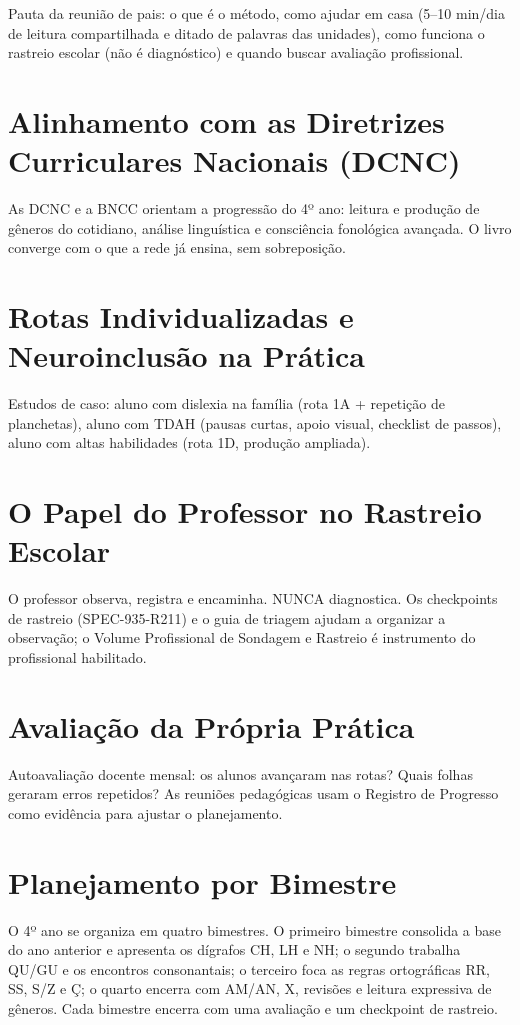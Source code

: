 Pauta da reunião de pais: o que é o método, como ajudar em casa (5–10 min/dia de leitura compartilhada e ditado de palavras das unidades), como funciona o rastreio escolar (não é diagnóstico) e quando buscar avaliação profissional.


\chapter{Alinhamento com as Diretrizes Curriculares Nacionais (DCNC)}

As DCNC e a BNCC orientam a progressão do 4º ano: leitura e produção de gêneros do cotidiano, análise linguística e consciência fonológica avançada. O livro converge com o que a rede já ensina, sem sobreposição.


\chapter{Rotas Individualizadas e Neuroinclusão na Prática}

Estudos de caso: aluno com dislexia na família (rota 1A + repetição de planchetas), aluno com TDAH (pausas curtas, apoio visual, checklist de passos), aluno com altas habilidades (rota 1D, produção ampliada).


\chapter{O Papel do Professor no Rastreio Escolar}

O professor observa, registra e encaminha. NUNCA diagnostica. Os checkpoints de rastreio (SPEC-935-R211) e o guia de triagem ajudam a organizar a observação; o Volume Profissional de Sondagem e Rastreio é instrumento do profissional habilitado.


\chapter{Avaliação da Própria Prática}

Autoavaliação docente mensal: os alunos avançaram nas rotas? Quais folhas geraram erros repetidos? As reuniões pedagógicas usam o Registro de Progresso como evidência para ajustar o planejamento.


\chapter{Planejamento por Bimestre}

O 4º ano se organiza em quatro bimestres. O primeiro bimestre consolida a base do ano anterior e apresenta os dígrafos CH, LH e NH; o segundo trabalha QU/GU e os encontros consonantais; o terceiro foca as regras ortográficas RR, SS, S/Z e Ç; o quarto encerra com AM/AN, X, revisões e leitura expressiva de gêneros. Cada bimestre encerra com uma avaliação e um checkpoint de rastreio.



